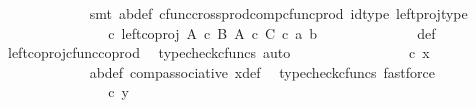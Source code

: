 \begin{isabellebody}
\ \ \ \ \ \ \ \ \ \ \ \ \isamarkupfalse%
\ {\isacharparenleft}{\kern0pt}smt\ ab{\isacharunderscore}{\kern0pt}def\ cfunc{\isacharunderscore}{\kern0pt}cross{\isacharunderscore}{\kern0pt}prod{\isacharunderscore}{\kern0pt}comp{\isacharunderscore}{\kern0pt}cfunc{\isacharunderscore}{\kern0pt}prod\ id{\isacharunderscore}{\kern0pt}type\ left{\isacharunderscore}{\kern0pt}proj{\isacharunderscore}{\kern0pt}type{\isacharparenright}{\kern0pt}\isanewline
\ \ \ \ \ \ \ \ \ \ \isamarkupfalse%
\ \isamarkupfalse%
\ {\isachardoublequoteopen}{\isachardot}{\kern0pt}{\isachardot}{\kern0pt}{\isachardot}{\kern0pt}\ {\isacharequal}{\kern0pt}\ {\isacharparenleft}{\kern0pt}{\isasymphi}\ {\isasymcirc}\isactrlsub c\ left{\isacharunderscore}{\kern0pt}coproj\ {\isacharparenleft}{\kern0pt}A\ {\isasymtimes}\isactrlsub c\ B{\isacharparenright}{\kern0pt}\ {\isacharparenleft}{\kern0pt}A\ {\isasymtimes}\isactrlsub c\ C{\isacharparenright}{\kern0pt}{\isacharparenright}{\kern0pt}\ {\isasymcirc}\isactrlsub c\ {\isasymlangle}a{\isacharcomma}{\kern0pt}\ b{\isasymrangle}{\isachardoublequoteclose}\isanewline
\ \ \ \ \ \ \ \ \ \ \ \ \isamarkupfalse%
\ {\isasymphi}{\isacharunderscore}{\kern0pt}def\ \isamarkupfalse%
\ \ left{\isacharunderscore}{\kern0pt}coproj{\isacharunderscore}{\kern0pt}cfunc{\isacharunderscore}{\kern0pt}coprod\ \isamarkupfalse%
\ {\isacharparenleft}{\kern0pt}typecheck{\isacharunderscore}{\kern0pt}cfuncs{\isacharcomma}{\kern0pt}\ auto{\isacharparenright}{\kern0pt}\isanewline
\ \ \ \ \ \ \ \ \ \ \isamarkupfalse%
\ \isamarkupfalse%
\ {\isachardoublequoteopen}{\isachardot}{\kern0pt}{\isachardot}{\kern0pt}{\isachardot}{\kern0pt}\ {\isacharequal}{\kern0pt}\ {\isasymphi}\ {\isasymcirc}\isactrlsub c\ x{\isachardoublequoteclose}\isanewline
\ \ \ \ \ \ \ \ \ \ \ \ \isamarkupfalse%
\ ab{\isacharunderscore}{\kern0pt}def\ comp{\isacharunderscore}{\kern0pt}associative{}\ x{\isacharprime}{\kern0pt}{\isacharunderscore}{\kern0pt}def\ \isamarkupfalse%
\ {\isacharparenleft}{\kern0pt}typecheck{\isacharunderscore}{\kern0pt}cfuncs{\isacharcomma}{\kern0pt}\ fastforce{\isacharparenright}{\kern0pt}\isanewline
\ \ \ \ \ \ \ \ \ \ \isamarkupfalse%
\ \isamarkupfalse%
\ {\isachardoublequoteopen}{\isachardot}{\kern0pt}{\isachardot}{\kern0pt}{\isachardot}{\kern0pt}\ {\isacharequal}{\kern0pt}\ {\isasymphi}\ {\isasymcirc}\isactrlsub c\ y{\isachardoublequoteclose}\isanewline
\ \ \ \ \ \ \ \ \ \ \ \ \isamarkupfalse%

\end{isabellebody}
